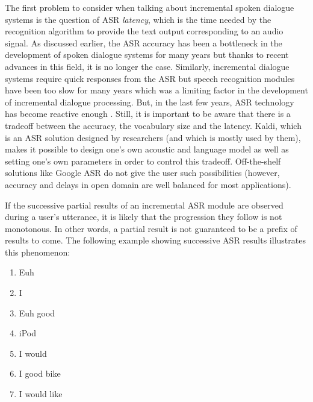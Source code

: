                                   The first problem to consider when talking about incremental spoken dialogue systems is the question of ASR \textit{latency}, which is the time needed by the recognition algorithm to provide the text output corresponding to an audio signal. As discussed earlier, the ASR accuracy has been a bottleneck in the development of spoken dialogue systems for many years but thanks to recent advances in this field, it is no longer the case. Similarly, incremental dialogue systems require quick responses from the ASR but speech recognition modules have been too slow for many years which was a limiting factor in the development of incremental dialogue processing. But, in the last few years, ASR technology has become reactive enough \cite{Breslin2013,Platek2014}. Still, it is important to be aware that there is a tradeoff between the accuracy, the vocabulary size and the latency. Kaldi, which is an ASR solution designed by researchers (and which is mostly used by them), makes it possible to design one's own acoustic and language model as well as setting one's own parameters in order to control this tradeoff. Off-the-shelf solutions like Google ASR do not give the user such possibilities (however, accuracy and delays in open domain are well balanced for most applications).

                                  If the successive partial results of an incremental ASR module are observed during a user's utterance, it is likely that the progression they follow is not monotonous. In other words, a partial result is not guaranteed to be a prefix of results to come. The following example showing successive ASR results illustrates this phenomenon:

                                  \begin{enumerate}
                                    \item Euh
                                      \item I
                                        \item Euh good
                                          \item iPod
                                            \item I would
                                              \item I good bike
                                                \item I would like
                                                  \end{enumerate}

